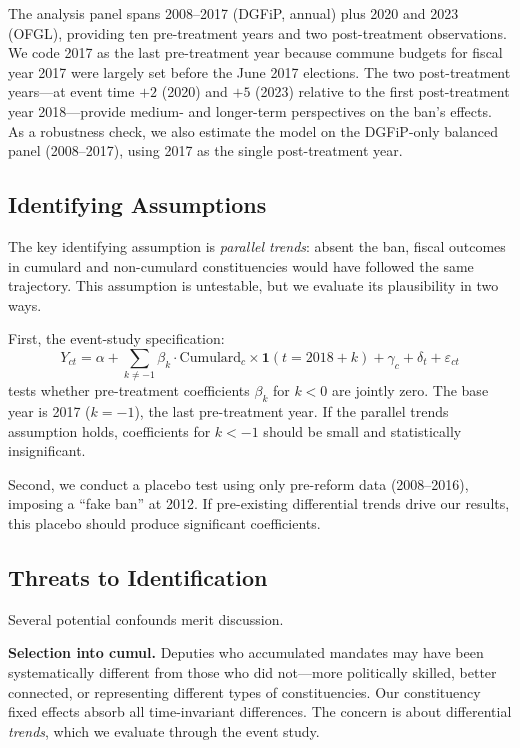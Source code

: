 \documentclass[12pt]{article}
\begin{document}
The analysis panel spans 2008--2017 (DGFiP, annual) plus 2020 and 2023 (OFGL), providing ten pre-treatment years and two post-treatment observations. We code 2017 as the last pre-treatment year because commune budgets for fiscal year 2017 were largely set before the June 2017 elections. The two post-treatment years---at event time $+2$ (2020) and $+5$ (2023) relative to the first post-treatment year 2018---provide medium- and longer-term perspectives on the ban's effects. As a robustness check, we also estimate the model on the DGFiP-only balanced panel (2008--2017), using 2017 as the single post-treatment year.

\subsection{Identifying Assumptions}

The key identifying assumption is \textit{parallel trends}: absent the ban, fiscal outcomes in cumulard and non-cumulard constituencies would have followed the same trajectory. This assumption is untestable, but we evaluate its plausibility in two ways.

First, the event-study specification:
\begin{equation}\label{eq:es}
Y_{ct} = \alpha + \sum_{k \neq -1} \beta_k \cdot \text{Cumulard}_c \times \mathbf{1}(t = 2018 + k) + \gamma_c + \delta_t + \varepsilon_{ct}
\end{equation}
tests whether pre-treatment coefficients $\beta_k$ for $k < 0$ are jointly zero. The base year is 2017 ($k = -1$), the last pre-treatment year. If the parallel trends assumption holds, coefficients for $k < -1$ should be small and statistically insignificant.

Second, we conduct a placebo test using only pre-reform data (2008--2016), imposing a ``fake ban'' at 2012. If pre-existing differential trends drive our results, this placebo should produce significant coefficients.

\subsection{Threats to Identification}

Several potential confounds merit discussion.

\textbf{Selection into cumul.} Deputies who accumulated mandates may have been systematically different from those who did not---more politically skilled, better connected, or representing different types of constituencies. Our constituency fixed effects absorb all time-invariant differences. The concern is about differential \textit{trends}, which we evaluate through the event study.
\end{document}
